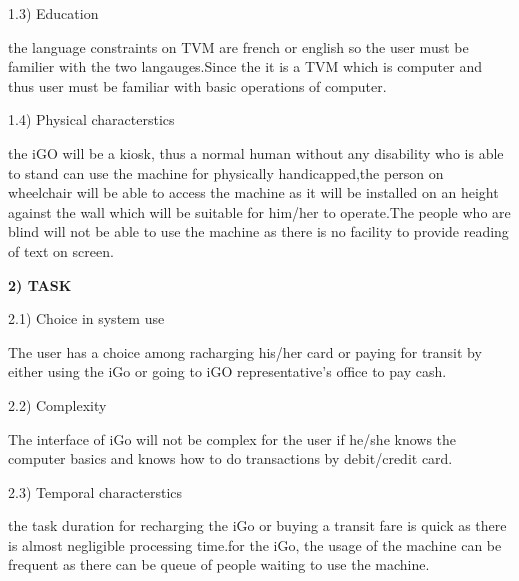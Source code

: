 \documentclass[12pt]{article}
\begin{document}
\vspace{\baselineskip}

\vspace{\baselineskip}
1.3) Education\par

the language constraints on TVM are french or english so the user must be familier with the two langauges.Since the it is a TVM which is computer and thus user must be familiar with basic operations of computer.\par


\vspace{\baselineskip}

\vspace{\baselineskip}

\vspace{\baselineskip}
1.4) Physical characterstics\par

the iGO will be a kiosk, thus a normal human without any disability who is able to stand can use the machine for physically handicapped,the person on wheelchair will be able to access the machine as it will be installed on an height against the wall which will be suitable for him/her to operate.The people who are blind will not be able to use the machine as there is no facility to provide reading of text on screen.\par


\vspace{\baselineskip}
\textbf{2) TASK}\par

2.1) Choice in system use\par

The user has a choice among racharging his/her card or paying for transit by either using the iGo or going to iGO representative's office to pay cash.\par


\vspace{\baselineskip}
2.2) Complexity\par

The interface of iGo will not be complex for the user if he/she knows the computer basics and knows how to do transactions by debit/credit card.\par


\vspace{\baselineskip}
2.3) Temporal characterstics\par

the task duration for recharging the iGo or buying a transit fare is quick as there is almost negligible processing time.for the iGo, the usage of the machine can be frequent as there can be queue of people waiting to use the machine.\par
\end{document}

